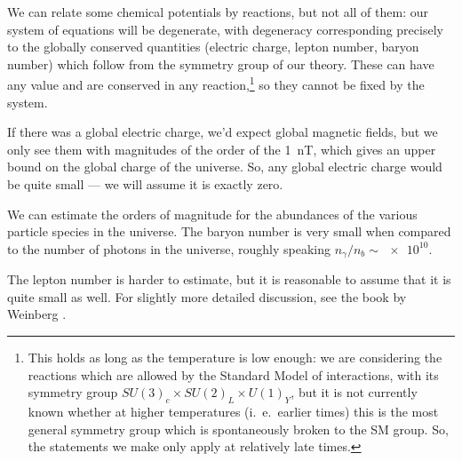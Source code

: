 \documentclass[main.tex]{subfiles}
\begin{document}
%
%



We can relate some chemical potentials by reactions, but not all of them: our system of equations will be degenerate, with degeneracy corresponding precisely to the globally conserved quantities (electric charge, lepton number, baryon number) which follow from the symmetry group of our theory. 
These can have any value and are conserved in any reaction,\footnote{This holds as long as the temperature is low enough: we are considering the reactions which are allowed by the Standard Model of interactions, with its symmetry group \(SU(3)_c \times SU(2)_L \times U(1)_Y\), but it is not currently known whether at higher temperatures (i.\ e.\ earlier times) this is the most general symmetry group which is spontaneously broken to the SM group. So, the statements we make only apply at relatively late times.} so they cannot be fixed by the system.

If there was a global electric charge, we'd expect global magnetic fields, but we only see them with magnitudes of the order of the \SI{1}{nT}, which gives an upper bound on the global charge of the universe.
So, any global electric charge would be quite small --- we will assume it is exactly zero. 

We can estimate the orders of magnitude for the abundances of the various particle species in the universe.
The baryon number is very small when compared to the number of photons in the universe, roughly speaking \(n_\gamma / n_b \sim \num{e10}\). 

The lepton number is harder to estimate, but it is reasonable to assume that it is quite small as well.
For slightly more detailed discussion, see the book by Weinberg \cite[before eq. 15.6.5]{weinbergGravitationCosmologyPrinciples1972}.
\end{document}
